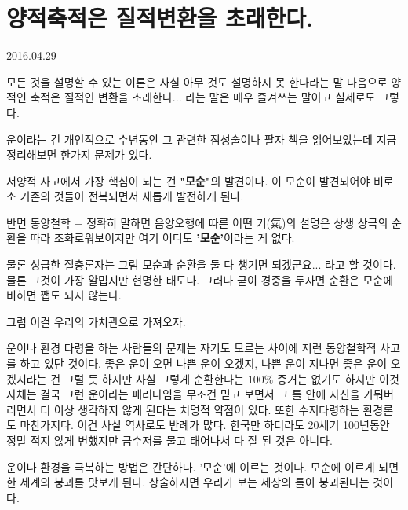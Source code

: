 \section{양적축적은 질적변환을 초래한다.}
\href{https://www.kockoc.com/Apoc/751576}{2016.04.29}

\vspace{5mm}

모든 것을 설명할 수 있는 이론은 사실 아무 것도 설명하지 못 한다라는 말 다음으로
양적인 축적은 질적인 변환을 초래한다... 라는 말은 매우 즐겨쓰는 말이고 실제로도 그렇다.
\vspace{5mm}

운이라는 건 개인적으로 수년동안 그 관련한 점성술이나 팔자 책을 읽어보았는데 지금 정리해보면 한가지 문제가 있다.
\vspace{5mm}

서양적 사고에서 가장 핵심이 되는 건 \textbf{"모순"}의 발견이다.
이 모순이 발견되어야 비로소 기존의 것들이 전복되면서 새롭게 발전하게 된다.
\vspace{5mm}

반면 동양철학 $-$ 정확히 말하면 음양오행에 따른 어떤 기(氣)의 설명은 상생 상극의 순환을 따라 조화로워보이지만
여기 어디도 \textbf{'모순'}이라는 게 없다.
\vspace{5mm}

물론 성급한 절충론자는 그럼 모순과 순환을 둘 다 챙기면 되겠군요... 라고 할 것이다. 물론 그것이 가장 얄밉지만 현명한 태도다.
그러나 굳이 경중을 두자면 순환은 모순에 비하면 쨉도 되지 않는다.
\vspace{5mm}

그럼 이걸 우리의 가치관으로 가져오자.
\vspace{5mm}

운이나 환경 타령을 하는 사람들의 문제는 자기도 모르는 사이에 저런 동양철학적 사고를 하고 있단 것이다.
좋은 운이 오면 나쁜 운이 오겠지, 나쁜 운이 지나면 좋은 운이 오겠지라는 건 그럴 듯 하지만 사실 그렇게 순환한다는 100$\%$ 증거는 없기도 하지만
이것 자체는 결국 그런 운이라는 패러다임을 무조건 믿고 보면서 그 틀 안에 자신을 가둬버리면서 더 이상 생각하지 않게 된다는 치명적 약점이 있다.
또한 수저타령하는 환경론도 마찬가지다. 이건 사실 역사로도 반례가 많다.
한국만 하더라도 20세기 100년동안 정말 적지 않게 변했지만 금수저를 물고 태어나서 다 잘 된 것은 아니다.
\vspace{5mm}

운이나 환경을 극복하는 방법은 간단하다. '모순'에 이르는 것이다.
모순에 이르게 되면 한 세계의 붕괴를 맛보게 된다.
상술하자면 우리가 보는 세상의 틀이 붕괴된다는 것이다.
\vspace{5mm}

